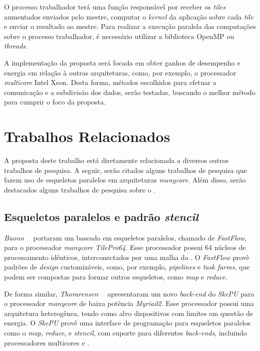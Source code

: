 O processo trabalhador terá uma função responsável por receber os
\textit{tiles} aumentados enviados pelo mestre, computar o \textit{kernel} da aplicação
sobre cada \textit{tile} e enviar o resultado ao mestre. Para realizar a
execução paralela das computações sobre o processo trabalhador, é necessário utilizar a biblioteca OpenMP ou
\posix \textit{threads}.

A implementação da proposta será focada em obter ganhos de desempenho e energia
em relação à outras arquiteturas, como, por exemplo, o processador
\textit{multicore} Intel Xeon. Desta forma, métodos escolhidos para efetuar a
comunicação e a subdivisão dos dados, serão testadas, buscando o melhor método
para cumprir o foco da proposta.

\section{Trabalhos Relacionados}

A proposta deste trabalho está diretamente relacionada a diversos outros trabalhos de pesquisa.
A seguir, serão citados alguns trabalhos de pesquisa que fazem uso de esqueletos paralelos em
arquiteturas \textit{manycore}. Além disso, serão destacados alguns trabalhos de pesquisa sobre
o \mppa.


\subsection{Esqueletos paralelos e padrão \textit{stencil}}
\emph{Buono}~\etal~\cite{buono13} portaram um \fw baseado em esqueletos paralelos,
chamado de \emph{FastFlow}, para o processador \textit{manycore} \emph{TilePro64}.
Esse processador possui 64 núcleos de processamento idênticos, interconectados
por uma malha da \noc. O \fw \emph{FastFlow} provê padrões de \textit{design}
customizáveis, como, por exemplo, \textit{pipelines} e \textit{task farms},
que podem ser compostas para formar outros esqueletos, como \textit{map} e
\textit{reduce}.

De forma similar, \emph{Thorarensen}~\etal~\cite{thoraransen16} apresentaram um
novo \textit{back-end} do \fw \emph{SkePU} para o processador \textit{manycore}
de baixa potência \emph{Myriad2}. Esse processador possui uma arquitetura
heterogênea, tendo como alvo dispositivos com limites em questão de energia.
O \fw \emph{SkePU} provê uma interface de programação para esqueletos paralelos
como o \textit{map}, \textit{reduce}, e \textit{stencil}, com suporte para
diferentes \textit{back-ends}, incluindo processadores multicores e \gpus.

